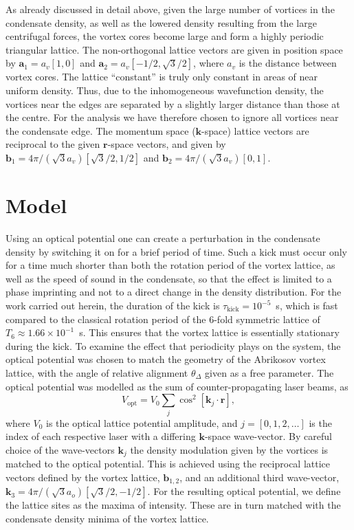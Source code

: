 As already discussed in detail above, given the large number of vortices in the condensate density, as well as the lowered density resulting from the large centrifugal forces, the vortex cores become large and form a highly periodic triangular lattice. The non-orthogonal lattice vectors are given in position space by $\mathbf{a}_1 = a_v[1,0]$ and $\mathbf{a}_2 = a_v[-1/2, \sqrt{3}/2]$, where $a_v$ is the distance between vortex cores. The lattice ``constant'' is truly only constant in areas of near uniform density. Thus, due to the inhomogeneous wavefunction density, the vortices near the edges are separated by a slightly larger distance than those at the centre. For the analysis we have therefore chosen to ignore all vortices near the condensate edge. The momentum space ($\mathbf{k}$-space) lattice vectors are reciprocal to the given $\mathbf{r}$-space vectors, and given by $\mathbf{b}_1 = 4\pi/(\sqrt{3}a_v)\left[\sqrt{3}/2,1/2\right]$ and $\mathbf{b}_2 = 4\pi/(\sqrt{3}a_v)\left[0,1\right]$.

\section{Model}

Using an optical potential one can create a perturbation in the condensate density by switching it on for a brief period of time. Such a kick must occur only for a time much shorter than both the rotation period of the vortex lattice, as well as the speed of sound in the condensate, so that the effect is limited to a phase imprinting and not to a direct change in the density distribution. For the work carried out herein, the duration of the kick is $\tau_{\text{kick}}=10^{-5}$~s, which is fast compared to the classical rotation period of the 6-fold symmetric lattice of $T_{6} \approx 1.66\times 10^{-1}$~s. This ensures that the vortex lattice is essentially stationary during the kick. To examine the effect that periodicity plays on the system, the optical potential was chosen to match the geometry of the Abrikosov vortex lattice, with the angle of relative alignment $\theta_\Delta$ given as a free parameter. The optical potential was modelled as the sum of counter-propagating laser beams, as
\begin{equation}
    V_{\text{opt}} = V_0\displaystyle\sum_{j}\cos^2 \left[ \textbf{k}_{j}\cdot\textbf{r} \right],
\end{equation}
where $V_0$ is the optical lattice potential amplitude, and $j=[0,1,2,\ldots ]$ is the index of each respective laser with a differing $\mathbf{k}$-space wave-vector. By careful choice of the wave-vectors $\textbf{k}_{j}$ the density modulation given by the vortices is matched to the optical potential. This is achieved using the reciprocal lattice vectors defined by the vortex lattice, $\mathbf{b}_{1,2}$, and an additional third wave-vector, $\mathbf{k}_3 = 4\pi/(\sqrt{3}a_o)\left[\sqrt{3}/2,-1/2\right]$. For the resulting optical potential, we define the lattice sites as the maxima of intensity. These are in turn matched with the condensate density minima of the vortex lattice.

